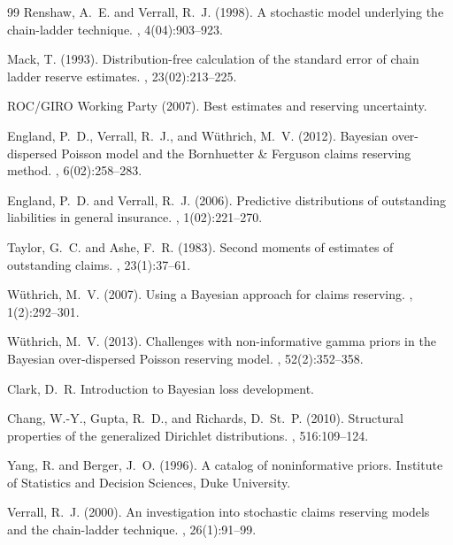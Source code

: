 \documentclass[aps,pre,draft]{revtex4-2}
\begin{document}
\begin{thebibliography}{99}
Renshaw, A.~E. and Verrall, R.~J. (1998).
\newblock A stochastic model underlying the chain-ladder technique.
, 4(04):903--923.

Mack, T. (1993).
\newblock Distribution-free calculation of the standard error of chain ladder reserve estimates.
, 23(02):213--225.

ROC/GIRO Working Party (2007).
\newblock Best estimates and reserving uncertainty.

England, P.~D., Verrall, R.~J., and W\"uthrich, M.~V. (2012).
\newblock Bayesian over-dispersed Poisson model and the Bornhuetter \& Ferguson claims reserving method.
, 6(02):258--283.

England, P.~D. and Verrall, R.~J. (2006).
\newblock Predictive distributions of outstanding liabilities in general insurance.
, 1(02):221--270.

Taylor, G.~C. and Ashe, F.~R. (1983).
\newblock Second moments of estimates of outstanding claims.
, 23(1):37--61.

W\"uthrich, M.~V. (2007).
\newblock Using a Bayesian approach for claims reserving.
, 1(2):292--301.

W\"uthrich, M.~V. (2013).
\newblock Challenges with non-informative gamma priors in the Bayesian over-dispersed Poisson reserving model.
, 52(2):352--358.

Clark, D.~R.
\newblock Introduction to Bayesian loss development.

Chang, W.-Y., Gupta, R.~D., and Richards, D.~St.~P. (2010).
\newblock Structural properties of the generalized Dirichlet distributions.
, 516:109--124.

Yang, R. and Berger, J.~O. (1996).
\newblock A catalog of noninformative priors.
\newblock Institute of Statistics and Decision Sciences, Duke University.

Verrall, R.~J. (2000).
\newblock An investigation into stochastic claims reserving models and the chain-ladder technique.
, 26(1):91--99.
\end{thebibliography}
\end{document}
